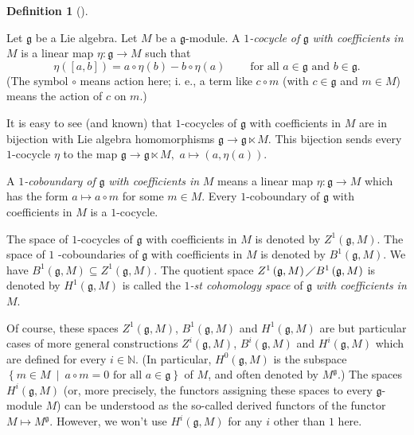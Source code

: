 \documentclass
[numbers=enddot,12pt,final,onecolumn,german,notitlepage]{scrartcl}%
\theoremstyle{definition}
\newtheorem{defi}[theo]{Definition}
\newenvironment{definition}[1][]
{\begin{defi}[#1]\begin{leftbar}}
{\end{leftbar}\end{defi}}
\begin{document}
\begin{definition}
Let $\mathfrak{g}$ be a Lie algebra. Let $M$ be a $\mathfrak{g}$-module. A
$1$\textit{-cocycle} \textit{of }$\mathfrak{g}$\textit{ with coefficients in
}$M$ is a linear map $\eta:\mathfrak{g}\rightarrow M$ such that%
\[
\eta\left(  \left[  a,b\right]  \right)  =a\circ\eta\left(  b\right)
-b\circ\eta\left(  a\right)  \ \ \ \ \ \ \ \ \ \ \text{for all }%
a\in\mathfrak{g}\text{ and }b\in\mathfrak{g}.
\]
(The symbol $\circ$ means action here; i. e., a term like $c\circ m$ (with
$c\in\mathfrak{g}$ and $m\in M$) means the action of $c$ on $m$.)

It is easy to see (and known) that $1$-cocycles of $\mathfrak{g}$ with
coefficients in $M$ are in bijection with Lie algebra homomorphisms
$\mathfrak{g}\rightarrow\mathfrak{g}\ltimes M$. This bijection sends every
$1$-cocycle $\eta$ to the map $\mathfrak{g}\rightarrow\mathfrak{g}\ltimes M,$
$a\mapsto\left(  a,\eta\left(  a\right)  \right)  $.

A $1$\textit{-coboundary of }$\mathfrak{g}$ \textit{with coefficients in }$M$
means a linear map $\eta:\mathfrak{g}\rightarrow M$ which has the form
$a\mapsto a\circ m$ for some $m\in M$. Every $1$-coboundary of $\mathfrak{g}$
with coefficients in $M$ is a $1$-cocycle.

The space of $1$-cocycles of $\mathfrak{g}$ with coefficients in $M$ is
denoted by $Z^{1}\left(  \mathfrak{g},M\right)  $. The space of $1$%
-coboundaries of $\mathfrak{g}$ with coefficients in $M$ is denoted by
$B^{1}\left(  \mathfrak{g},M\right)  $. We have $B^{1}\left(  \mathfrak{g}%
,M\right)  \subseteq Z^{1}\left(  \mathfrak{g},M\right)  $. The quotient space
$Z^{1}\left(  \mathfrak{g},M\right)  \diagup B^{1}\left(  \mathfrak{g}%
,M\right)  $ is denoted by $H^{1}\left(  \mathfrak{g},M\right)  $ is called
the $1$\textit{-st cohomology space} of $\mathfrak{g}$\textit{ with
coefficients in }$M$.

Of course, these spaces $Z^{1}\left(  \mathfrak{g},M\right)  $, $B^{1}\left(
\mathfrak{g},M\right)  $ and $H^{1}\left(  \mathfrak{g},M\right)  $ are but
particular cases of more general constructions $Z^{i}\left(  \mathfrak{g}%
,M\right)  $, $B^{i}\left(  \mathfrak{g},M\right)  $ and $H^{i}\left(
\mathfrak{g},M\right)  $ which are defined for every $i\in\mathbb{N}$. (In
particular, $H^{0}\left(  \mathfrak{g},M\right)  $ is the subspace $\left\{
m\in M\ \mid\ a\circ m=0\text{ for all }a\in\mathfrak{g}\right\}  $ of $M$,
and often denoted by $M^{\mathfrak{g}}$.) The spaces $H^{i}\left(
\mathfrak{g},M\right)  $ (or, more precisely, the functors assigning these
spaces to every $\mathfrak{g}$-module $M$) can be understood as the so-called
derived functors of the functor $M\mapsto M^{\mathfrak{g}}$. However, we won't
use $H^{i}\left(  \mathfrak{g},M\right)  $ for any $i$ other than $1$ here.


\end{definition}
\end{document}
